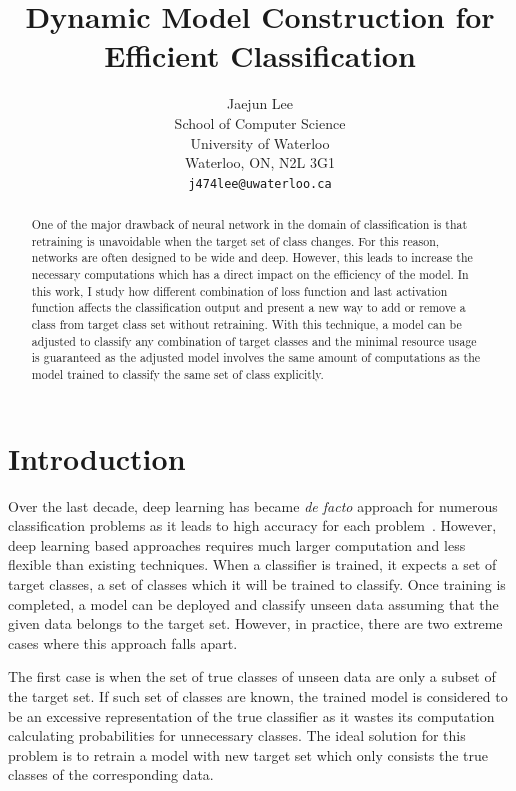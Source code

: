 \documentclass{article}
\title{Dynamic Model Construction for Efficient Classification}
\author{
    Jaejun Lee \\
    School of Computer Science\\
    University of Waterloo\\
    Waterloo, ON, N2L 3G1 \\
    \texttt{j474lee@uwaterloo.ca} \\
}
\begin{document}
\maketitle

\begin{abstract}

One of the major drawback of neural network in the domain of classification is that retraining is unavoidable when the target set of class changes. For this reason, networks are often designed to be wide and deep. However, this leads to increase the necessary computations which has a direct impact on the efficiency of the model. In this work, I study how different combination of loss function and last activation function affects the classification output and present a new way to add or remove a class from target class set without retraining. With this technique, a model can be adjusted to classify any combination of target classes and the minimal resource usage is guaranteed as the adjusted model involves the same amount of computations as the model trained to classify the same set of class explicitly.

\end{abstract}

\section{Introduction}

Over the last decade, deep learning has became {\it de facto} approach for numerous classification problems as it leads to high accuracy for each problem~\cite{}. However, deep learning based approaches requires much larger computation and less flexible than existing techniques. When a classifier is trained, it expects a set of target classes, a set of classes which it will be trained to classify. Once training is completed, a model can be deployed and classify unseen data assuming that the given data belongs to the target set. However, in practice, there are two extreme cases where this approach falls apart.

The first case is when the set of true classes of unseen data are only a subset of the target set. If such set of classes are known, the trained model is considered to be an excessive representation of the true classifier as it wastes its computation calculating probabilities for unnecessary classes. The ideal solution for this problem is to retrain a model with new target set which only consists the true classes of the corresponding data.
\end{document}
